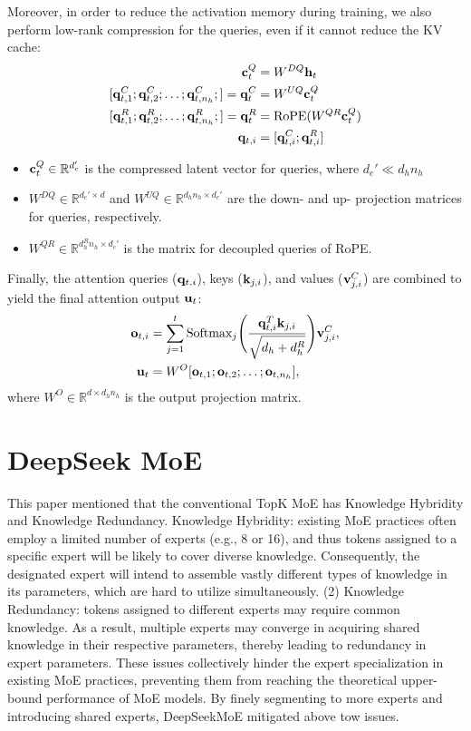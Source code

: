 Moreover, in order to reduce the activation memory during training, we also perform low-rank compression for the queries, even if it cannot reduce the KV cache:
\begin{align*}
	\rvc_t^{Q} &= W^{DQ}\rvh_t\\
	[\rvq_{t,1}^C; \rvq_{t,2}^C; \dots ;\rvq_{t,n_h}^C;] = \rvq_t^{C} &= W^{UQ}\rvc_t^{Q}\\
	[\rvq_{t,1}^R; \rvq_{t,2}^R; \dots ;\rvq_{t,n_h}^R;] = \rvq_t^{R} &= \text{RoPE}(W^{QR}\rvc_t^Q)\\
	\rvq_{t,i} &= [\rvq_{t,i}^C;\rvq_{t,i}^{R}]
\end{align*}
\begin{itemize}
	\item ${\mathbf{c}}_t^{Q}\in \mathbb{R}^{d_c'}$ is the compressed latent vector for queries, where $d_c'\ll d_hn_h$
	\item $W^{DQ}\in \mathbb{R}^{d_c'\times d}$ and $W^{UQ}\in \mathbb{R}^{d_hn_h\times d_c'}$ are the down- and up- projection matrices for queries, respectively.
	\item $W^{QR}\in \mathbb{R}^{d_h^Rn_h\times d_c'}$ is the matrix for decoupled queries of RoPE.
\end{itemize}

Finally, the attention queries (${\mathbf{q}}_{t,i}$), keys (${\mathbf{k}}_{j,i}$), and values (${\mathbf{v}}_{j,i}^C$) are combined to yield the final attention output ${\mathbf{u}}_t$:
\begin{align*}
	{\mathbf{o}}_{t,i} &= \sum_{j=1}^t\text{Softmax}_j\Bigg( \frac{{\mathbf{q}}_{t,i}^T{\mathbf{k}}_{j,i}}{\sqrt{d_h+d_h^R}} \Bigg){\mathbf{v}}_{j,i}^C,\\
	{\mathbf{u}}_t &= W^O[{\mathbf{o}}_{t,1};{\mathbf{o}}_{t,2};\dots;{\mathbf{o}}_{t,n_h}],
\end{align*}
where $W^O\in \mathbb{R}^{d\times d_hn_h}$ is the output projection matrix.


\section{DeepSeek MoE}

This paper mentioned that the conventional TopK MoE has Knowledge Hybridity and Knowledge Redundancy. Knowledge Hybridity: existing MoE practices often employ a limited number of experts (e.g., 8 or 16), and thus tokens assigned to a specific expert will be likely to cover diverse knowledge. Consequently, the designated expert will intend to assemble vastly different types of knowledge in its parameters, which are hard to utilize simultaneously. (2) Knowledge Redundancy: tokens assigned to different experts may require common knowledge. As a result, multiple experts may converge in acquiring shared knowledge in their respective parameters, thereby leading to redundancy in expert parameters. These issues collectively hinder the expert specialization in existing MoE practices, preventing them from reaching the theoretical upper-bound performance of MoE models. By finely segmenting to more experts and introducing shared experts, DeepSeekMoE mitigated above tow issues.


